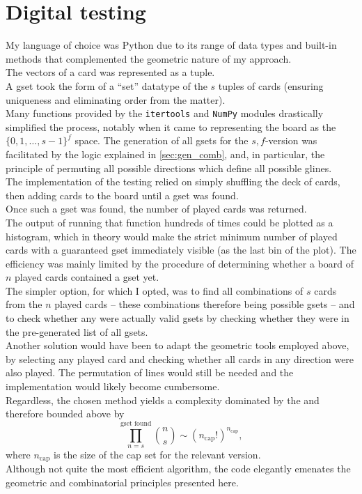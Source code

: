 \documentclass{article}
\theoremstyle{definition}
\theoremstyle{remark}
\begin{document}
\section{Digital testing}

My language of choice was Python due to its range of data types and built-in methods that complemented the geometric nature of my approach.\\
The vectors of a card was represented as a tuple.\\
A gset took the form of a ``set'' datatype of the $s$ tuples of cards (ensuring uniqueness and eliminating order from the matter).\\
Many functions provided by the \texttt{itertools} and \texttt{NumPy} modules drastically simplified the process, notably when it came to representing the board as the $\{0,1,\dots,s-1\}^f$ space.
\medbreak
The generation of all gsets for the $s,f$-version was facilitated by the logic explained in \autoref{sec:gen_comb}, and, in particular, the principle of permuting all possible directions which define all possible glines. \\
The implementation of the testing relied on simply shuffling the deck of cards, then adding cards to the board until a gset was found.\\
Once such a gset was found, the number of played cards was returned.\\
The output of running that function hundreds of times could be plotted as a histogram, which in theory would make the strict minimum number of played cards with a guaranteed gset immediately visible (as the last bin of the plot).
\medbreak
The efficiency was mainly limited by the procedure of determining whether a board of $n$ played cards contained a gset yet.\\
The simpler option, for which I opted, was to find all combinations of $s$ cards from the $n$ played cards -- these combinations therefore being possible gsets -- and to check whether any were actually valid gsets by checking whether they were in the pre-generated list of all gsets.\\
Another solution would have been to adapt the geometric tools employed above, by selecting any played card and checking whether all cards in any direction were also played. The permutation of lines would still be needed and the implementation would likely become cumbersome.\\
Regardless, the chosen method yields a complexity dominated by the and therefore bounded above by
\[ \prod_{n=s}^{\text{gset found}} \binom{n}{s} \sim (n_{\text{cap}}!)^{n_{\text{cap}}},\]
where $n_\text{cap}$ is the size of the cap set for the relevant version.\\
Although not quite the most efficient algorithm, the code elegantly emenates the geometric and combinatorial principles presented here.
\end{document}
